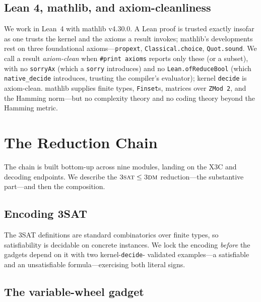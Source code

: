 \documentclass[a4paper,UKenglish,cleveref,autoref]{lipics-v2021}
\begin{document}
\subsection{Lean 4, mathlib, and axiom-cleanliness}\label{sec:axiomclean}

We work in Lean~4 with mathlib v4.30.0. A Lean proof is trusted exactly insofar as one trusts the kernel and
the axioms a result invokes; mathlib's developments rest on three foundational axioms---\lstinline{propext},
\lstinline{Classical.choice}, \lstinline{Quot.sound}. We call a result \emph{axiom-clean} when
\lstinline{#print axioms} reports only these (or a subset), with no \lstinline{sorryAx} (which a
\lstinline{sorry} introduces) and no \lstinline{Lean.ofReduceBool} (which \lstinline{native_decide} introduces,
trusting the compiler's evaluator); kernel \lstinline{decide} is axiom-clean. mathlib supplies finite types,
\lstinline{Finset}s, matrices over \lstinline{ZMod 2}, and the Hamming norm---but no complexity theory and no
coding theory beyond the Hamming metric.

\section{The Reduction Chain}\label{sec:chain}

The chain is built bottom-up across nine modules, landing on the X3C and decoding endpoints. We describe the
$\textsc{3sat} \le \textsc{3dm}$ reduction---the substantive part---and then the composition.

\subsection{Encoding 3SAT}\label{sec:3sat}

The 3SAT definitions are standard combinatorics over finite types, so satisfiability is decidable on concrete
instances. We lock the encoding \emph{before} the gadgets depend on it with two kernel-\lstinline{decide}-
validated examples---a satisfiable and an unsatisfiable formula---exercising both literal signs.

\subsection{The variable-wheel gadget}\label{sec:wheel}
\end{document}
